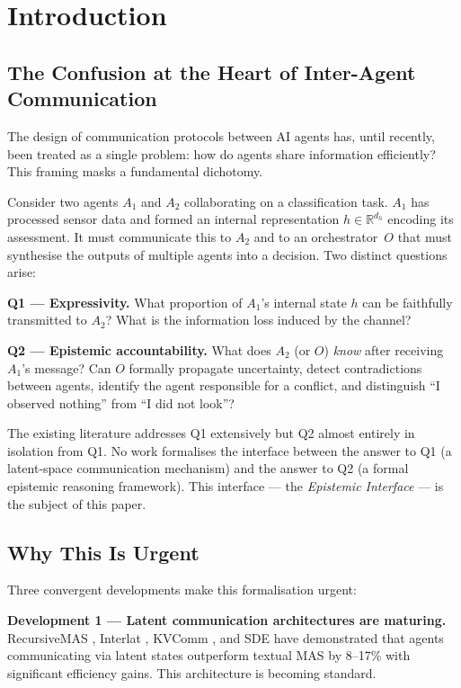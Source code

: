\documentclass[11pt,a4paper]{article}
\theoremstyle{plain}
\theoremstyle{definition}
\theoremstyle{remark}
\newcommand{\Real}{\mathbb{R}}
\begin{document}
\newpage
\tableofcontents
\newpage

\section{Introduction}

\subsection{The Confusion at the Heart of Inter-Agent Communication}

The design of communication protocols between AI agents has, until recently, been
treated as a single problem: how do agents share information efficiently? This
framing masks a fundamental dichotomy.

Consider two agents $A_1$ and $A_2$ collaborating on a classification task.
$A_1$ has processed sensor data and formed an internal representation
$h \in \Real^{d_h}$ encoding its assessment. It must communicate this to $A_2$
and to an orchestrator~$O$ that must synthesise the outputs of multiple agents
into a decision. Two distinct questions arise:

\textbf{Q1 --- Expressivity.} What proportion of $A_1$'s internal state $h$ can be
faithfully transmitted to $A_2$? What is the information loss induced by the
channel?

\textbf{Q2 --- Epistemic accountability.} What does $A_2$ (or $O$) \emph{know}
after receiving $A_1$'s message? Can $O$ formally propagate uncertainty, detect
contradictions between agents, identify the agent responsible for a conflict, and
distinguish ``I observed nothing'' from ``I did not look''?

The existing literature addresses Q1 extensively but Q2 almost entirely in
isolation from Q1. No work formalises the interface between the answer to Q1 (a
latent-space communication mechanism) and the answer to Q2 (a formal epistemic
reasoning framework). This interface --- the \emph{Epistemic Interface} --- is the
subject of this paper.

\subsection{Why This Is Urgent}

Three convergent developments make this formalisation urgent:

\textbf{Development 1 --- Latent communication architectures are maturing.}
RecursiveMAS \cite{yang2026}, Interlat \cite{du2025}, KVComm \cite{ye2025}, and
SDE \cite{tang2025} have demonstrated that agents communicating via latent states
outperform textual MAS by 8--17\% with significant efficiency gains. This
architecture is becoming standard.
\end{document}
